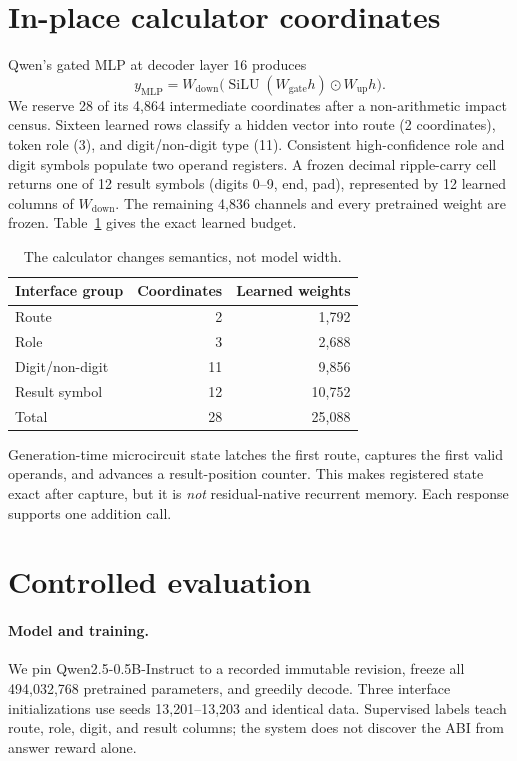 \documentclass{article}
\begin{document}
\section{In-place calculator coordinates}

Qwen's gated MLP at decoder layer 16 produces
\[
y_{\mathrm{MLP}}=W_{\mathrm{down}}
\bigl(\operatorname{SiLU}(W_{\mathrm{gate}}h)\odot W_{\mathrm{up}}h\bigr).
\]
We reserve 28 of its 4,864 intermediate coordinates after a non-arithmetic
impact census. Sixteen learned rows classify a hidden vector into route
(2 coordinates), token role (3), and digit/non-digit type (11). Consistent
high-confidence role and digit symbols populate two operand registers. A
frozen decimal ripple-carry cell returns one of 12 result symbols
(digits 0--9, end, pad), represented by 12 learned columns of
$W_{\mathrm{down}}$. The remaining 4,836 channels and every pretrained weight
are frozen. Table~\ref{tab:params} gives the exact learned budget.

\begin{table}[t]
\caption{The calculator changes semantics, not model width.}
\label{tab:params}
\centering
\small
\begin{tabular}{lrr}
\toprule
Interface group & Coordinates & Learned weights\\
\midrule
Route & 2 & 1,792\\
Role & 3 & 2,688\\
Digit/non-digit & 11 & 9,856\\
Result symbol & 12 & 10,752\\
\midrule
Total & 28 & 25,088\\
\bottomrule
\end{tabular}
\end{table}

Generation-time microcircuit state latches the first route, captures the first
valid operands, and advances a result-position counter. This makes registered
state exact after capture, but it is \emph{not} residual-native recurrent
memory. Each response supports one addition call.

\section{Controlled evaluation}

\paragraph{Model and training.}
We pin Qwen2.5-0.5B-Instruct to a recorded immutable revision, freeze all
494,032,768 pretrained parameters, and greedily decode. Three interface
initializations use seeds 13,201--13,203 and identical data. Supervised labels
teach route, role, digit, and result columns; the system does not discover the
ABI from answer reward alone.
\end{document}
